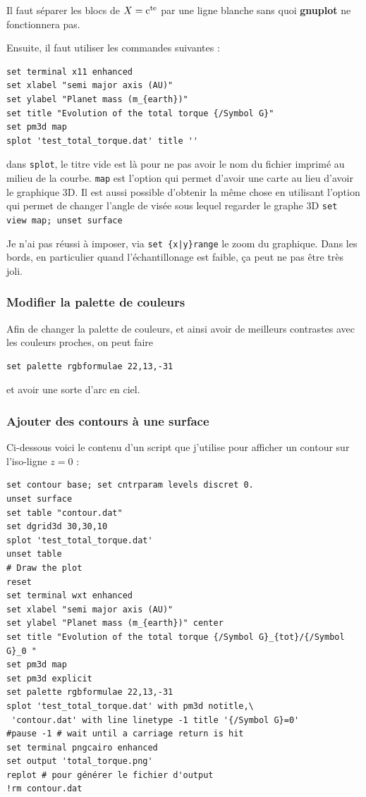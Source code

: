 \documentclass[a4paper,twoside]{article}
\begin{document}
\begin{attention}
Il faut séparer les blocs de $X=\mathrm{c^{te}}$ par une ligne blanche sans quoi \textbf{gnuplot} ne fonctionnera pas.
\end{attention}


Ensuite, il faut utiliser les commandes suivantes :
\begin{verbatim}
set terminal x11 enhanced
set xlabel "semi major axis (AU)"
set ylabel "Planet mass (m_{earth})"
set title "Evolution of the total torque {/Symbol G}"
set pm3d map
splot 'test_total_torque.dat' title ''
\end{verbatim}
dans \texttt{splot}, le titre vide est là pour ne pas avoir le nom du fichier imprimé au milieu de la courbe. \texttt{map} est l'option qui permet d'avoir une carte au lieu d'avoir le graphique 3D. Il est aussi possible d'obtenir la même chose en utilisant l'option qui permet de changer l'angle de visée sous lequel regarder le graphe 3D \texttt{set view map; unset surface}

\begin{remarque}
Je n'ai pas réussi à imposer, via \verb#set {x|y}range# le zoom du graphique. Dans les bords, en particulier quand l'échantillonage est faible, ça peut ne pas être très joli. 
\end{remarque}

\subsubsection{Modifier la palette de couleurs}
Afin de changer la palette de couleurs, et ainsi avoir de meilleurs contrastes avec les couleurs proches, on peut faire 
\begin{verbatim}
set palette rgbformulae 22,13,-31
\end{verbatim}
et avoir une sorte d'arc en ciel.

\subsubsection{Ajouter des contours à une surface}\label{sec:contour}
Ci-dessous voici le contenu d'un script que j'utilise pour afficher un contour sur l'iso-ligne $z=0$ : 
\begin{verbatim}
set contour base; set cntrparam levels discret 0.
unset surface
set table "contour.dat"
set dgrid3d 30,30,10
splot 'test_total_torque.dat'
unset table
# Draw the plot
reset
set terminal wxt enhanced
set xlabel "semi major axis (AU)"
set ylabel "Planet mass (m_{earth})" center
set title "Evolution of the total torque {/Symbol G}_{tot}/{/Symbol G}_0 "
set pm3d map
set pm3d explicit
set palette rgbformulae 22,13,-31
splot 'test_total_torque.dat' with pm3d notitle,\
 'contour.dat' with line linetype -1 title '{/Symbol G}=0'
#pause -1 # wait until a carriage return is hit
set terminal pngcairo enhanced
set output 'total_torque.png'
replot # pour générer le fichier d'output
!rm contour.dat
\end{verbatim}
\end{document}
